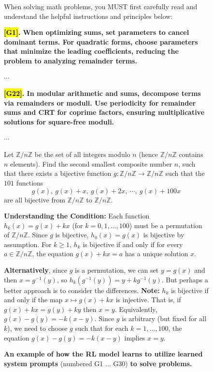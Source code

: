 \documentclass{article}
\theoremstyle{plain}
\theoremstyle{definition}
\theoremstyle{remark}
\begin{document}
\begin{figure}[!tb]
\centering
\caption{\textbf{An example of how the RL model learns to utilize learned system prompts} (numbered G1 $\dots$ G30) \textbf{to solve problems.}}

\begin{runcard}[title={Example of How E-SPL Shapes Model Behavior}]

\medskip

\begin{runbox}[title={\textbf{Learned System Prompt}}]
When solving math problems, you MUST first carefully read and understand the helpful instructions and principles below:

\textbf{\color{Brown}\hl{{[G1]}}. When optimizing sums, set parameters to cancel dominant terms. For quadratic forms, choose parameters that minimize the leading coefficients, reducing the problem to analyzing remainder terms.}

$\cdots$

\textbf{\color{Brown}\hl{{[G22]}}. In modular arithmetic and sums, decompose terms via remainders or moduli. Use periodicity for remainder sums and CRT for coprime factors, ensuring multiplicative solutions for square-free moduli.}

$\cdots$
\end{runbox}

\begin{runbox}[title={Problem}]
Let \(\mathbb{Z}/n\mathbb{Z}\) be the set of all integers modulo \(n\) (hence \(\mathbb{Z}/n\mathbb{Z}\) contains \(n\) elements). Find the second smallest composite number \(n\), such that there exists a bijective function \(g:\mathbb{Z}/n\mathbb{Z}\to \mathbb{Z}/n\mathbb{Z}\) such that the \(101\) functions
\[ g(x),\ g(x)+x,\ g(x)+2x,\ \cdots,\ g(x)+100x \]
are all bijective from \(\mathbb{Z}/n\mathbb{Z}\) to \(\mathbb{Z}/n\mathbb{Z}\).
\end{runbox}

\begin{runbox}[title={Model Output}]
\textbf{Understanding the Condition:}
Each function \(h_k(x) = g(x) + kx\) (for \(k=0,1,\ldots,100\)) must be a permutation of \(\mathbb{Z}/n\mathbb{Z}\). Since \(g\) is bijective, \(h_0(x)=g(x)\) is bijective by assumption. For \(k \geq 1\), \(h_k\) is bijective if and only if for every \(a \in \mathbb{Z}/n\mathbb{Z}\), the equation \(g(x) + kx = a\) has a unique solution \(x\).

\textbf{Alternatively}, since \(g\) is a permutation, we can set \(y = g(x)\) and then \(x = g^{-1}(y)\), so
$
h_k(g^{-1}(y)) = y + k g^{-1}(y).
$
{But perhaps} a better approach is to consider the differences.
\textbf{Note:}
\(h_k\) is bijective if and only if the map \(x \mapsto g(x) + kx\) is injective. That is, if
$
g(x) + kx = g(y) + ky
$
then \(x = y\). Equivalently,
$
g(x) - g(y) = -k(x-y).
$
Since \(g\) is arbitrary (but fixed for all \(k\)), we need to choose \(g\) such that for each \(k=1,\ldots,100\), the equation \(g(x) - g(y) = -k(x-y)\) implies \(x=y\).


\end{runbox}
\end{runcard}
\end{figure}
\end{document}
